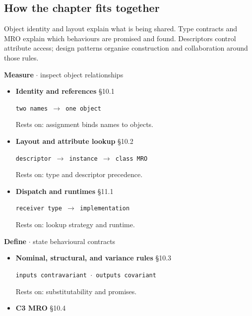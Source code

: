 \documentclass[11pt]{article}
\begin{document}
\begin{keepsection}
\section{How the chapter fits together}

Object identity and layout explain what is being shared. Type contracts and MRO explain which behaviours are promised and found. Descriptors control attribute access; design patterns organise construction and collaboration around those rules.

\textbf{Measure} \ensuremath{\cdot} inspect object relationships

\begin{itemize}
\item {}
\textbf{Identity and references} \hfill{\small\color{FAUblue}§10.1}

\texttt{two names \ensuremath{\to} one object}

Rests on: assignment binds names to objects.
\item {}
\textbf{Layout and attribute lookup} \hfill{\small\color{FAUblue}§10.2}

\texttt{descriptor \ensuremath{\to} instance \ensuremath{\to} class MRO}

Rests on: type and descriptor precedence.
\item {}
\textbf{Dispatch and runtimes} \hfill{\small\color{FAUblue}§11.1}

\texttt{receiver type \ensuremath{\to} implementation}

Rests on: lookup strategy and runtime.
\end{itemize}

\textbf{Define} \ensuremath{\cdot} state behavioural contracts

\begin{itemize}
\item {}
\textbf{Nominal, structural, and variance rules} \hfill{\small\color{FAUblue}§10.3}

\texttt{inputs contravariant \ensuremath{\cdot} outputs covariant}

Rests on: substitutability and promises.
\item {}
\textbf{C3 MRO} \hfill{\small\color{FAUblue}§10.4}


\end{itemize}
\end{keepsection}
\end{document}

